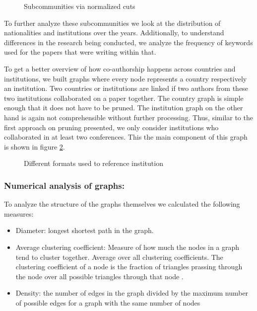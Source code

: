 \documentclass[journal,twocolumn]{IEEEtran}
\providecommand{\tightlist}{%
      \setlength{\itemsep}{0pt}\setlength{\parskip}{0pt}}
\begin{document}
    \begin{figure}
        \begin{center}\end{center}
        \caption{Subcommunities via normalized cuts}
        \label{normalized}
    \end{figure}
    
    To further analyze these subcommunities we look at the distribution of
nationalities and institutions over the years. Additionally, to
understand differences in the research being conducted, we analyze the
frequency of keywords used for the papers that were writing within that.

To get a better overview of how co-authorship happens across countries
and institutions, we built graphs where every node represents a country
respectively an institution. Two countries or institutions are linked if
two authors from these two institutions collaborated on a paper
together. The country graph is simple enough that it does not have to be
pruned. The institution graph on the other hand is again not
comprehensible without further processing. Thus, similar to the first
approach on pruning presented, we only consider institutions who
collaborated in at least two conferences. This the main component of
this graph is shown in figure \ref{unigraph}.


    \begin{figure}
        \begin{center}\end{center}
        \caption{Different formats used to reference institution}
        \label{unigraph}
    \end{figure}
    
    \hypertarget{numerical-analysis-of-graphs}{%
\subsubsection{Numerical analysis of
graphs:}\label{numerical-analysis-of-graphs}}

To analyze the structure of the graphs themselves we calculated the
following measures:

\begin{itemize}
\tightlist
\item
  Diameter: longest shortest path in the graph.
\item
  Average clustering coefficient: Measure of how much the nodes in a
  graph tend to cluster together. Average over all clustering
  coefficients. The clustering coefficient of a node is the fraction of
  triangles prassing through the node over all possible triangles
  through that node \cite{watts1998collective}.
\item
  Density: the number of edges in the graph divided by the maximum
  number of possible edges for a graph with the same number of nodes
\end{itemize}
\end{document}

